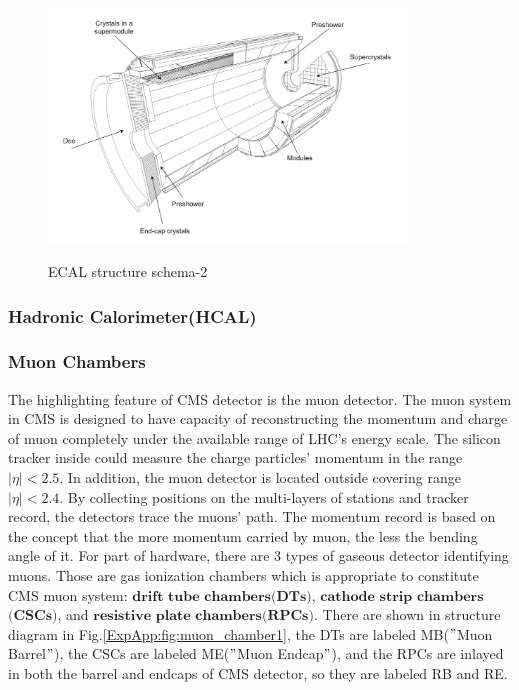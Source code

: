 			\begin{figure}[H]
			\centering{}
		    	\includegraphics[width=0.85\textwidth]{Figures/ExpApparatus/ECAL2.png}\\
			\caption{ECAL structure schema-2\cite{ECAL_ex}}
			\label{ExpApp:fig:ECAL2}
			\end{figure}
			\FloatBarrier

		\subsubsection{Hadronic Calorimeter(HCAL)}
		\label{sssec:hcal}

		\subsubsection{Muon Chambers}
		\label{sssec:muon_detector}

			The highlighting feature of CMS detector is the muon detector. The muon system in CMS is designed to have capacity of reconstructing the momentum and charge of muon completely under the available range of LHC's energy scale. The silicon tracker inside could measure the charge particles' momentum in the range $|\eta|<2.5$. In addition, the muon detector is located outside covering range $|\eta|<2.4$. By collecting positions on the multi-layers of stations and tracker record, the detectors trace the muons' path. The momentum record is based on the concept that the more momentum carried by muon, the less the bending angle of it. For part of hardware, there are 3 types of gaseous detector identifying muons. Those are gas ionization chambers which is appropriate to constitute CMS muon system: $\textbf{drift}$ $\textbf{tube}$ $\textbf{chambers}$$\textbf{(DTs)}$, $\textbf{cathode}$ $\textbf{strip}$ $\textbf{chambers}$$\textbf{(CSCs)}$, and $\textbf{resistive}$ $\textbf{plate}$ $\textbf{chambers}$$\textbf{(RPCs)}$. There are shown in structure diagram in Fig.\ref{ExpApp:fig:muon_chamber1}, the DTs are labeled MB($"$Muon Barrel$"$), the CSCs are labeled ME($"$Muon Endcap$"$), and the RPCs are inlayed in both the barrel and endcaps of CMS detector, so they are labeled RB and RE.

